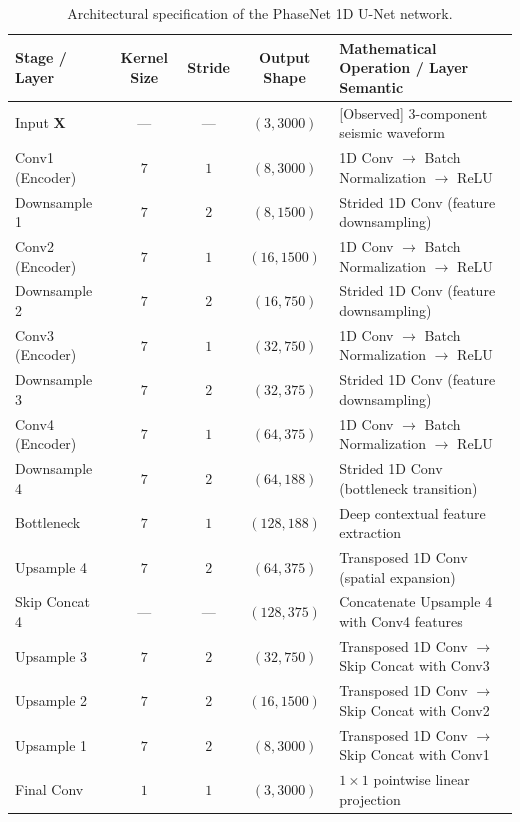 \begin{table}[htbp]
  \centering
  \small
  \caption{Architectural specification of the PhaseNet 1D U-Net network.}
  \label{tab:phasenet_architecture}
  \begin{threeparttable}
    \begin{tabularx}{\linewidth}{l c c c X}
      \toprule
      \textbf{Stage / Layer} & \textbf{Kernel Size} & \textbf{Stride} & \textbf{Output Shape\tnote{a}} & \textbf{Mathematical Operation / Layer Semantic} \\
      \midrule
      Input $\mathbf{X}$ & --- & --- & $(3, 3000)$ & [Observed] 3-component seismic waveform \\
      Conv1 (Encoder) & $7$ & $1$ & $(8, 3000)$ & 1D Conv $\to$ Batch Normalization $\to$ ReLU \\
      Downsample 1 & $7$ & $2$ & $(8, 1500)$ & Strided 1D Conv (feature downsampling) \\
      Conv2 (Encoder) & $7$ & $1$ & $(16, 1500)$ & 1D Conv $\to$ Batch Normalization $\to$ ReLU \\
      Downsample 2 & $7$ & $2$ & $(16, 750)$ & Strided 1D Conv (feature downsampling) \\
      Conv3 (Encoder) & $7$ & $1$ & $(32, 750)$ & 1D Conv $\to$ Batch Normalization $\to$ ReLU \\
      Downsample 3 & $7$ & $2$ & $(32, 375)$ & Strided 1D Conv (feature downsampling) \\
      Conv4 (Encoder) & $7$ & $1$ & $(64, 375)$ & 1D Conv $\to$ Batch Normalization $\to$ ReLU \\
      Downsample 4 & $7$ & $2$ & $(64, 188)$ & Strided 1D Conv (bottleneck transition) \\
      Bottleneck & $7$ & $1$ & $(128, 188)$ & Deep contextual feature extraction \\
      Upsample 4 & $7$ & $2$ & $(64, 375)$ & Transposed 1D Conv (spatial expansion) \\
      Skip Concat 4 & --- & --- & $(128, 375)$ & Concatenate Upsample 4 with Conv4 features \\
      Upsample 3 & $7$ & $2$ & $(32, 750)$ & Transposed 1D Conv $\to$ Skip Concat with Conv3 \\
      Upsample 2 & $7$ & $2$ & $(16, 1500)$ & Transposed 1D Conv $\to$ Skip Concat with Conv2 \\
      Upsample 1 & $7$ & $2$ & $(8, 3000)$ & Transposed 1D Conv $\to$ Skip Concat with Conv1 \\
      Final Conv & $1$ & $1$ & $(3, 3000)$ & $1\times 1$ pointwise linear projection \\

\end{tabularx}
\end{threeparttable}
\end{table}
